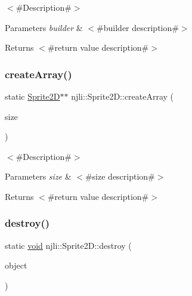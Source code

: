 $<$\#\+Description\#$>$


\begin{DoxyParams}{Parameters}
{\em builder} & $<$\#builder description\#$>$\\
\hline
\end{DoxyParams}
\begin{DoxyReturn}{Returns}
$<$\#return value description\#$>$ 
\end{DoxyReturn}
\mbox{\label{classnjli_1_1_sprite2_d_a75bf99fa3eeaff0c3ce8b526da172690}} 
\subsubsection{\texorpdfstring{create\+Array()}{createArray()}}
{\footnotesize\ttfamily static \mbox{\hyperlink{classnjli_1_1_sprite2_d}{Sprite2D}}$\ast$$\ast$ njli\+::\+Sprite2\+D\+::create\+Array (\begin{DoxyParamCaption}\item[{const \mbox{\hyperlink{_util_8h_a10e94b422ef0c20dcdec20d31a1f5049}{u32}}}]{size }\end{DoxyParamCaption})\hspace{0.3cm}{\ttfamily [static]}}

$<$\#\+Description\#$>$


\begin{DoxyParams}{Parameters}
{\em size} & $<$\#size description\#$>$\\
\hline
\end{DoxyParams}
\begin{DoxyReturn}{Returns}
$<$\#return value description\#$>$ 
\end{DoxyReturn}
\mbox{\label{classnjli_1_1_sprite2_d_a7ee4f6b5135262c0ea30f46a51b3c7a8}} 
\subsubsection{\texorpdfstring{destroy()}{destroy()}}
{\footnotesize\ttfamily static \mbox{\hyperlink{_thread_8h_af1e856da2e658414cb2456cb6f7ebc66}{void}} njli\+::\+Sprite2\+D\+::destroy (\begin{DoxyParamCaption}\item[{\mbox{\hyperlink{classnjli_1_1_sprite2_d}{Sprite2D}} $\ast$}]{object }\end{DoxyParamCaption})\hspace{0.3cm}{\ttfamily [static]}}

